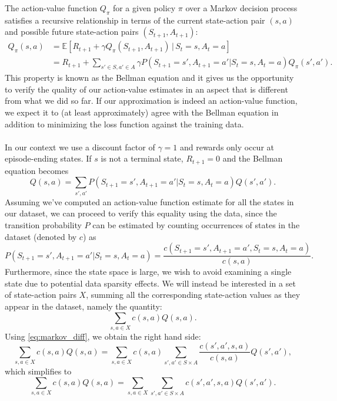 \documentclass{sfuthesis}
\begin{document}
The action-value function $Q_\pi$ for a given policy $\pi$ over a Markov decision process satisfies a recursive relationship in terms of the current state-action pair $(s,a)$ and possible future state-action pairs $(S_{t+1},A_{t+1})$: 
\begin{align}
Q_\pi(s,a) &= \mathbb{E} \left[  R_{t+1} + \gamma Q_{\pi}(S_{t+1}, A_{t+1}) \, | \, S_t = s, A_t = a \right]\\
&=  R_{t+1} + \sum_{s' \in S, a' \in A} \gamma P(S_{t+1} = s', A_{t+1} = a' | S_t = s, A_t = a) Q_\pi(s',a').
\end{align}
This property is known as the Bellman equation \cite{sutton2018reinforcement} and it gives us the opportunity to verify the quality of our action-value estimates in an aspect that is different from what we did so far. If our approximation is indeed an action-value function, we expect it to (at least approximately) agree with the Bellman equation in addition to minimizing the loss function against the training data.\\\\
In our context we use a discount factor of $\gamma = 1$ and rewards only occur at episode-ending states. If $s$ is not a terminal state, $R_{t+1} = 0$ and the Bellman equation becomes
\begin{equation}
Q(s,a) = \sum_{s',a'} P(S_{t+1} = s', A_{t+1} = a' | S_t = s, A_t = a) Q(s',a').
\label{eq:markov_diff}
\end{equation}
Assuming we've computed an action-value function estimate for all the states in our dataset, we can proceed to verify this equality using the data, since the transition probability $P$ can be estimated by counting occurrences of states in the dataset (denoted by $c$) as
$$P(S_{t+1} = s', A_{t+1} = a' | S_t = s, A_t = a) = \frac{c(S_{t+1} = s', A_{t+1} = a', S_t = s, A_t = a)}{c(s,a)}.$$
Furthermore, since the state space is large, we wish to avoid examining a single state due to potential data sparsity effects. We will instead be interested in a set of state-action pairs $X$, summing all the corresponding state-action values as they appear in the dataset, namely the quantity:
$$\sum_{s,a\in X} c(s,a)Q(s,a).$$
Using \eqref{eq:markov_diff}, we obtain the right hand side:
\begin{equation}
\sum_{s,a\in X} c(s,a)Q(s,a) = \sum_{s,a\in X} c(s,a)\sum_{s',a'\in S\times A} \frac{c(s',a',s,a)}{c(s,a)} Q(s',a'),
\end{equation}
which simplifies to
\begin{equation}
\sum_{s,a\in X} c(s,a)Q(s,a) = \sum_{s,a\in X} \sum_{s',a'\in S\times A} c(s',a',s,a) Q(s',a').
\label{eq:markov_num}
\end{equation}
\end{document}
